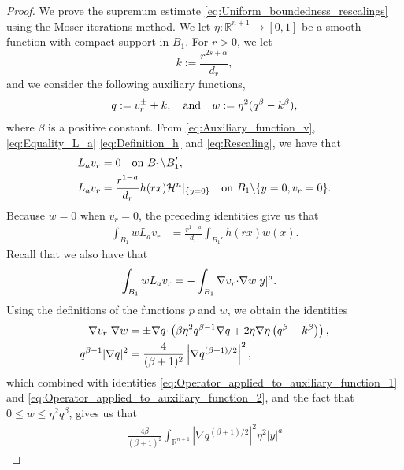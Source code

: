 \documentclass[11pt,reqno]{amsart}
\theoremstyle{definition}
\theoremstyle{remark}
\begin{document}
\begin{proof}
We prove the supremum estimate \eqref{eq:Uniform_boundedness_rescalings} using the Moser iterations method. We let $\eta:{\mathbb{R}}^{n+1}\rightarrow [0,1]$ be a smooth function with compact support in $B_1$. For $r>0$, we let
\begin{equation}
\label{eq:Choice_k}
k:=\frac{r^{2s+\alpha}}{d_r},
\end{equation}
and we consider the following auxiliary functions,
\begin{align*}
q:=v_r^{\pm}+k,\quad\hbox{and}\quad w:=\eta^2(q^{\beta}-k^{\beta}),
\end{align*}
where $\beta$ is a positive constant. From \eqref{eq:Auxiliary_function_v}, \eqref{eq:Equality_L_a} \eqref{eq:Definition_h} and \eqref{eq:Rescaling}, we have that
\begin{align*}  
L_a v_r &=0\quad\hbox{on } B_1\backslash B_1',\\
L_a v_r &=\frac{r^{1-a}}{d_r} h(rx) {{\mathcal{H}}}^{n}|_{\{y=0\}}\quad\hbox{on } B_1\backslash \{y=0, v_r=0\}.
\end{align*}
Because $w=0$ when $v_r=0$, the preceding identities give us that
\begin{align}
\label{eq:Operator_applied_to_auxiliary_function_1}
\int_{B_1} w L_a v_r &= \frac{r^{1-a}}{d_r} \int_{B_1'} h(rx)w(x).
\end{align}
Recall that we also have that
\begin{align}
\label{eq:Operator_applied_to_auxiliary_function_2}
\int_{B_1} w L_a v_r &=-\int_{B_1}\nabla v_r {\hbox{$\cdot$}}\nabla w|y|^a.
\end{align}
Using the definitions of the functions $p$ and $w$, we obtain the identities
\begin{align*}
\nabla v_r {\hbox{$\cdot$}}\nabla w &= \pm \nabla q{\hbox{$\cdot$}}\left(\beta\eta^2q^{\beta-1}\nabla q+2\eta\nabla\eta \left(q^{\beta}-k^{\beta}\right)\right),\\
q^{\beta-1} |\nabla q|^2 &= \frac{4}{(\beta+1)^2} \left|\nabla q^{(\beta+1)/2}\right|^2,
\end{align*}
which combined with identities \eqref{eq:Operator_applied_to_auxiliary_function_1} and \eqref{eq:Operator_applied_to_auxiliary_function_2}, and the fact that $0\leq w \leq \eta^2 q^{\beta}$, gives us that 
\begin{align}
\label{eq:Operator_applied_to_auxiliary_function_int_by_parts}
\frac{4\beta}{(\beta+1)^2} \int_{{\mathbb{R}}^{n+1}} \left|\nabla q^{(\beta+1)/2}\right|^2 \eta^2 |y|^a

\end{align}
\end{proof}
\end{document}
